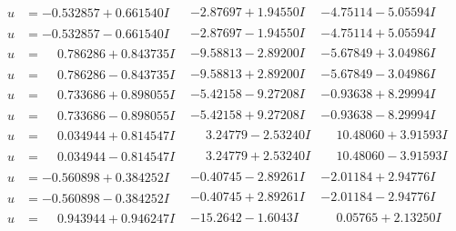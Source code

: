 \documentclass[1p]{elsarticle_modified}
\theoremstyle{definition}
\begin{document}
$$\begin{array}{c|c|c}
\begin{aligned}
u &= -0.532857 + 0.661540 I\end{aligned}
 & -2.87697 + 1.94550 I & -4.75114 - 5.05594 I \\ \hline\begin{aligned}
u &= -0.532857 - 0.661540 I\end{aligned}
 & -2.87697 - 1.94550 I & -4.75114 + 5.05594 I \\ \hline\begin{aligned}
u &= \phantom{-}0.786286 + 0.843735 I\end{aligned}
 & -9.58813 - 2.89200 I & -5.67849 + 3.04986 I \\ \hline\begin{aligned}
u &= \phantom{-}0.786286 - 0.843735 I\end{aligned}
 & -9.58813 + 2.89200 I & -5.67849 - 3.04986 I \\ \hline\begin{aligned}
u &= \phantom{-}0.733686 + 0.898055 I\end{aligned}
 & -5.42158 - 9.27208 I & -0.93638 + 8.29994 I \\ \hline\begin{aligned}
u &= \phantom{-}0.733686 - 0.898055 I\end{aligned}
 & -5.42158 + 9.27208 I & -0.93638 - 8.29994 I \\ \hline\begin{aligned}
u &= \phantom{-}0.034944 + 0.814547 I\end{aligned}
 & \phantom{-}3.24779 - 2.53240 I & \phantom{-}10.48060 + 3.91593 I \\ \hline\begin{aligned}
u &= \phantom{-}0.034944 - 0.814547 I\end{aligned}
 & \phantom{-}3.24779 + 2.53240 I & \phantom{-}10.48060 - 3.91593 I \\ \hline\begin{aligned}
u &= -0.560898 + 0.384252 I\end{aligned}
 & -0.40745 - 2.89261 I & -2.01184 + 2.94776 I \\ \hline\begin{aligned}
u &= -0.560898 - 0.384252 I\end{aligned}
 & -0.40745 + 2.89261 I & -2.01184 - 2.94776 I \\ \hline\begin{aligned}
u &= \phantom{-}0.943944 + 0.946247 I\end{aligned}
 & -15.2642 - 1.6043 I & \phantom{-}0.05765 + 2.13250 I \\ \hline\begin{aligned}

\end{aligned}
\end{array}$$
\end{document}
